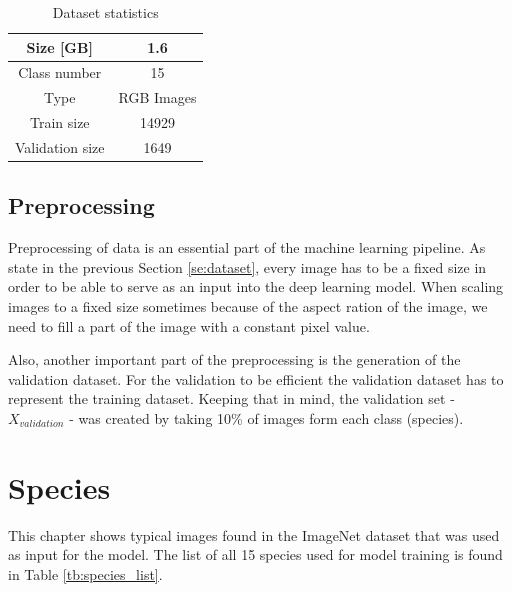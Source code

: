 \documentclass[times, utf8, diplomski]{fer}
\begin{document}
\begin{table}
\centering
\caption{Dataset statistics}
\label{tb:dataset_statistics}
\begin{tabular}{cc}
\hline 
Size [GB] & 1.6 \\ \hline 
Class number & 15 \\ 
Type & RGB Images \\ 
Train size & 14929 \\
Validation size & 1649 \\
\hline 
\end{tabular} 
\end{table}

\subsection{Preprocessing}
Preprocessing of data is an essential part of the machine learning pipeline. As state in the previous Section \ref{se:dataset}, every image has to be a fixed size in order to be able to serve as an input into the deep learning model. When scaling images to a fixed size sometimes because of the aspect ration of the image, we need to fill a part of the image with a constant pixel value.


Also, another important part of the preprocessing is the generation of the validation dataset. For the validation to be efficient the validation dataset has to represent the training dataset. Keeping that in mind, the validation set - $X_{validation}$ - was created by taking 10\% of images form each class (species).


\section{Species}
\label{se:species}

This chapter shows typical images found in the ImageNet dataset that was used as input for the model. The list of all 15 species used for model training is found in Table \ref{tb:species_list}.
\end{document}
